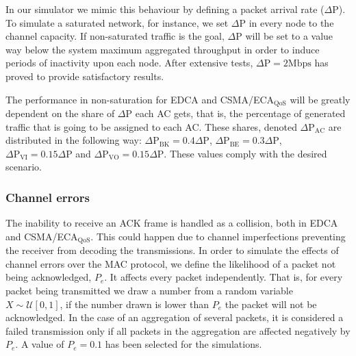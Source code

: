 In our simulator we mimic this behaviour by defining a packet arrival rate ($\Delta\text{P}$). To simulate a saturated network, for instance, we set $\Delta\text{P}$ in every node to the channel capacity. If non-saturated traffic is the goal, $\Delta\text{P}$ will be set to a value way below the system maximum aggregated throughput in order to induce periods of inactivity upon each node. After extensive tests, $\Delta\text{P}=2\text{Mbps}$ has proved to provide satisfactory results.

The performance in non-saturation for EDCA and CSMA/ECA$_{\text{QoS}}$ will be greatly dependent on the share of $\Delta\text{P}$ each AC gets, that is, the percentage of generated traffic that is going to be assigned to each AC. These shares, denoted $\Delta\text{P}_{\text{AC}}$ are distributed in the following way: $\Delta\text{P}_{\text{BK}}=0.4\Delta\text{P}$, $\Delta\text{P}_{\text{BE}}=0.3\Delta\text{P}$, $\Delta\text{P}_{\text{VI}}=0.15\Delta\text{P}$ and $\Delta\text{P}_{\text{VO}}=0.15\Delta\text{P}$. These values comply with the desired scenario.

	
\subsubsection{Channel errors}
The inability to receive an ACK frame is handled as a collision, both in EDCA and CSMA/ECA$_{\text{QoS}}$. This could happen due to channel imperfections preventing the receiver from decoding the transmissions. In order to simulate the effects of channel errors over the MAC protocol, we define the likelihood of a packet not being acknowledged, $P_e$. It affects every packet independently. That is, for every packet being transmitted we draw a number from a random variable $X\sim\mathcal{U}[0,1]$, if the number drawn is lower than $P_e$ the packet will not be acknowledged. In the case of an aggregation of several packets, it is considered a failed transmission only if all packets in the aggregation are affected negatively by $P_e$. A value of $P_e=0.1$ has been selected for the simulations.

